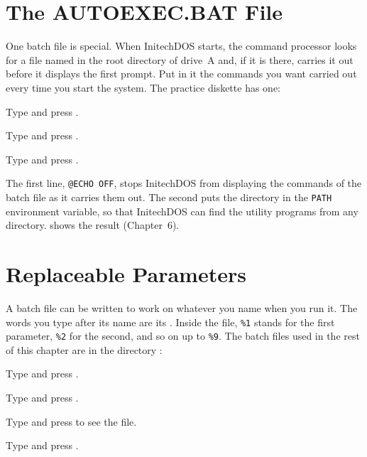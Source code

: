 \section{The AUTOEXEC.BAT File}
One batch file is special.  When InitechDOS starts, the command processor
looks for a file named  in the root directory of drive~A
and, if it is there, carries it out before it displays the first prompt.
Put in it the commands you want carried out every time you start the
system.  The practice diskette has one:
\begin{Steps}
\item Type  and press .
\item Type  and press .
\item Type  and press .
\end{Steps}


The first line, \texttt{@ECHO OFF}, stops InitechDOS from displaying the
commands of the batch file as it carries them out.  The second puts the
directory  in the \texttt{PATH} environment variable, so
that InitechDOS can find the utility programs from any directory.
 shows the result (Chapter~6).

\section{Replaceable Parameters}
A batch file can be written to work on whatever you name when you run it.
The words you type after its name are its .  Inside the
file, \texttt{\%1} stands for the first parameter, \texttt{\%2} for the
second, and so on up to \texttt{\%9}.  The batch files used in the rest of
this chapter are in the directory :
\begin{Steps}
\item Type  and press .
\item Type  and press .
\item Type  and press  to see the file.
\item Type  and press .
\end{Steps}


